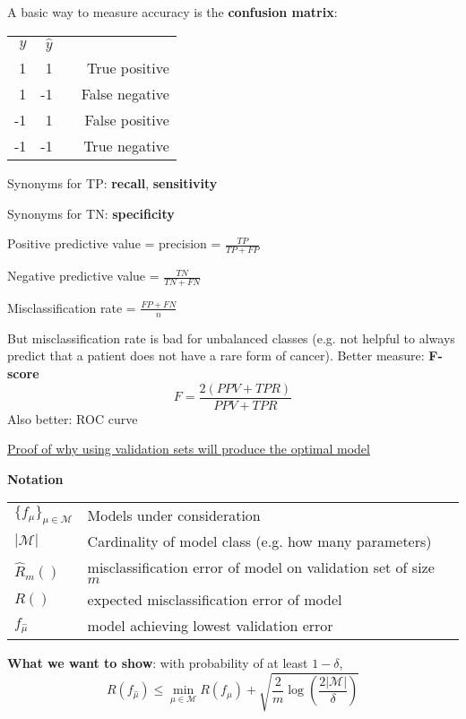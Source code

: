 \documentclass{article}
\begin{document}
A basic way to measure accuracy is the \textbf{confusion matrix}:

\begin{tabular}{r r r r}
$y$ & $\hat{y}$ & & \\
1 & 1 & & True positive \\
1 & -1 & & False negative \\
-1 & 1 & & False positive \\
-1 & -1 & & True negative \\
\end{tabular}

\medskip
Synonyms for TP: \textbf{recall}, \textbf{sensitivity}

\medskip
Synonyms for TN: \textbf{specificity}

\medskip
Positive predictive value = precision = $\frac{TP}{TP+FP}$

\medskip
Negative predictive value = $\frac{TN}{TN+FN}$

\medskip
Misclassification rate = $\frac{FP + FN}{n}$

\medskip
But misclassification rate is bad for unbalanced classes (e.g. not helpful to
always predict that a patient does not have a rare form of cancer). Better
measure: \textbf{F-score}
$$
F = \frac{2 (PPV + TPR)}{PPV + TPR}
$$
\medskip
Also better: ROC curve

\medskip
\underline{Proof of why using validation sets will produce the optimal
model}

\medskip

\textbf{Notation}

\smallskip

\begin{tabular}{l l}
$\{f_\mu\}_{\mu \in \mathcal{M}}$ & Models under consideration \\
$|\mathcal{M}|$ & Cardinality of model class (e.g. how many parameters) \\
$\hat{R}_m()$ & misclassification error of model on validation set of size $m$ \\
$R()$ & expected misclassification error of model \\
$f_{\hat{\mu}}$ & model achieving lowest validation error \\
\end{tabular}

\medskip

\textbf{What we want to show}: with probability of at least $1-\delta$,
$$
R(f_{\hat{\mu}}) \leq \min_{\mu \in \mathcal{M}} R(f_\mu) +
\sqrt{\frac{2}{m}\log\left(\frac{2|\mathcal{M}|}{\delta} \right)}
$$
\end{document}
